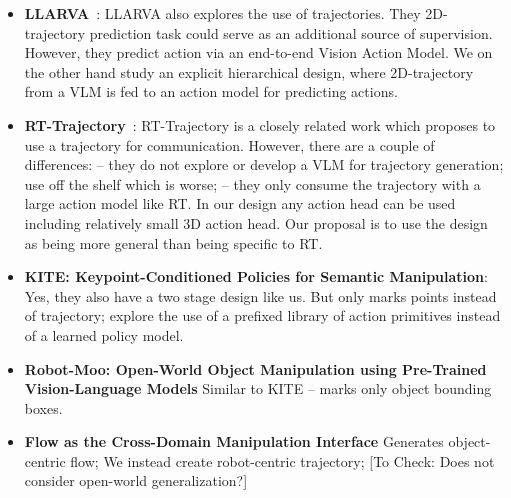 \begin{itemize}
    \item \textbf{LLARVA}~\citep{niu2024llarva}: LLARVA also explores the use of trajectories. They 2D-trajectory prediction task could serve as an additional source of supervision. However, they predict action via an end-to-end Vision Action Model. We on the other hand study an explicit hierarchical design, where 2D-trajectory from a VLM is fed to an action model for predicting actions. 
    \item \textbf{RT-Trajectory}~\citep{gu2023rttrajectory}: RT-Trajectory is a closely related work which proposes to use a trajectory for communication. However, there are a couple of differences:
    -- they do not explore or develop a VLM for trajectory generation; use off the shelf which is worse; 
    -- they only consume the trajectory with a large action model like RT. In our design any action head can be used including relatively small 3D action head. Our proposal is to use the design as being more general than being specific to RT. 
    \item \textbf{KITE: Keypoint-Conditioned Policies for Semantic Manipulation}: Yes, they also have a two stage design like us. But only marks points instead of trajectory; explore the use of a prefixed library of action primitives instead of a learned policy model.
    \item \textbf{Robot-Moo: Open-World Object Manipulation using Pre-Trained Vision-Language Models} Similar to KITE -- marks only object bounding boxes.
    \item \textbf{Flow as the Cross-Domain Manipulation Interface} Generates object-centric flow; We instead create robot-centric trajectory; [To Check: Does not consider open-world generalization?]

\end{itemize}
